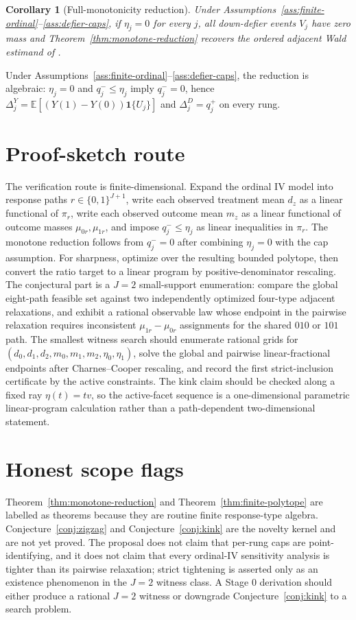 \documentclass[11pt]{article}
\newcommand{\E}{\mathbb{E}}
\newcommand{\one}{\mathbf{1}}
\theoremstyle{definition}
\theoremstyle{plain}
\newtheorem{corollary}{Corollary}
\theoremstyle{remark}
\begin{document}
\begin{corollary}[Full-monotonicity reduction]\label{cor:full-monotone}
Under Assumptions~\ref{ass:finite-ordinal}--\ref{ass:defier-caps}, if \(\eta_j=0\) for every \(j\), all down-defier events \(V_j\) have zero mass and Theorem~\ref{thm:monotone-reduction} recovers the ordered adjacent Wald estimand of \citet{AngristImbens1995}.
\end{corollary}
Under Assumptions~\ref{ass:finite-ordinal}--\ref{ass:defier-caps}, the reduction is algebraic: \(\eta_j=0\) and \(q^-_j\le\eta_j\) imply \(q^-_j=0\), hence \(\Delta^Y_j=\E[(Y(1)-Y(0))\one\{U_j\}]\) and \(\Delta^D_j=q^+_j\) on every rung.

\section{Proof-sketch route}
The verification route is finite-dimensional.  Expand the ordinal IV model into response paths \(r\in\{0,1\}^{J+1}\), write each observed treatment mean \(d_z\) as a linear functional of \(\pi_r\), write each observed outcome mean \(m_z\) as a linear functional of outcome masses \(\mu_{0r},\mu_{1r}\), and impose \(q^-_j\le\eta_j\) as linear inequalities in \(\pi_r\).  The monotone reduction follows from \(q^-_j=0\) after combining \(\eta_j=0\) with the cap assumption.  For sharpness, optimize over the resulting bounded polytope, then convert the ratio target to a linear program by positive-denominator rescaling.  The conjectural part is a \(J=2\) small-support enumeration: compare the global eight-path feasible set against two independently optimized four-type adjacent relaxations, and exhibit a rational observable law whose endpoint in the pairwise relaxation requires inconsistent \(\mu_{1r}-\mu_{0r}\) assignments for the shared \(010\) or \(101\) path.  The smallest witness search should enumerate rational grids for \((d_0,d_1,d_2,m_0,m_1,m_2,\eta_0,\eta_1)\), solve the global and pairwise linear-fractional endpoints after Charnes--Cooper rescaling, and record the first strict-inclusion certificate by the active constraints.  The kink claim should be checked along a fixed ray \(\eta(t)=t v\), so the active-facet sequence is a one-dimensional parametric linear-program calculation rather than a path-dependent two-dimensional statement.

\section{Honest scope flags}
Theorem~\ref{thm:monotone-reduction} and Theorem~\ref{thm:finite-polytope} are labelled as theorems because they are routine finite response-type algebra.  Conjecture~\ref{conj:zigzag} and Conjecture~\ref{conj:kink} are the novelty kernel and are not yet proved.  The proposal does not claim that per-rung caps are point-identifying, and it does not claim that every ordinal-IV sensitivity analysis is tighter than its pairwise relaxation; strict tightening is asserted only as an existence phenomenon in the \(J=2\) witness class.  A Stage 0 derivation should either produce a rational \(J=2\) witness or downgrade Conjecture~\ref{conj:kink} to a search problem.
\end{document}
